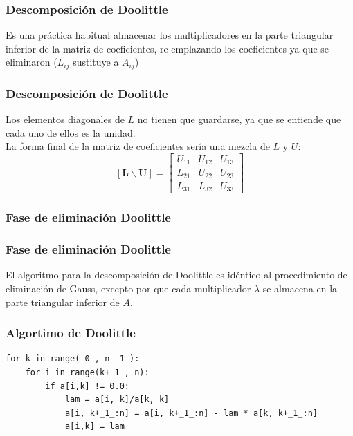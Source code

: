 \begin{frame}
\frametitle{Descomposición de Doolittle}
Es una práctica habitual almacenar los multiplicadores en la parte triangular inferior de la matriz de coeficientes, re-emplazando los coeficientes ya que se eliminaron ($L_{ij}$ sustituye a $A_{ij}$)
\end{frame}
\begin{frame}
\frametitle{Descomposición de Doolittle}
Los elementos diagonales de $L$ no tienen que guardarse, ya que se entiende que cada uno de ellos es la unidad.
\\
\bigskip
La forma final de la matriz de coeficientes sería una mezcla de $L$ y $U$:
\[ [\mathbf{L \backslash U} ] =
	\begin{bmatrix}
		U_{11} & U_{12} & U_{13} \\
		L_{21} & U_{22} & U_{23} \\
		L_{31} & L_{32} & U_{33}
	\end{bmatrix} \]
\end{frame}
\subsubsection{Fase de eliminación Doolittle}
\begin{frame}[fragile]
\frametitle{Fase de eliminación Doolittle}
El algoritmo para la descomposición de Doolittle es idéntico al procedimiento de eliminación de Gauss, excepto por que cada multiplicador $\lambda$ se almacena en la parte triangular inferior de $A$.
\end{frame}
\begin{frame}[fragile]
\frametitle{Algortimo de Doolittle}
\begin{lstlisting}[caption=Código para obtener las matrices LU, style=FormattedNumber, basicstyle=\linespread{1.1}\ttfamily=\small, columns=fullflexible]
for k in range(_0_, n-_1_):
    for i in range(k+_1_, n):
        if a[i,k] != 0.0:
            lam = a[i, k]/a[k, k]
            a[i, k+_1_:n] = a[i, k+_1_:n] - lam * a[k, k+_1_:n]
            a[i,k] = lam
\end{lstlisting}
\end{frame}
